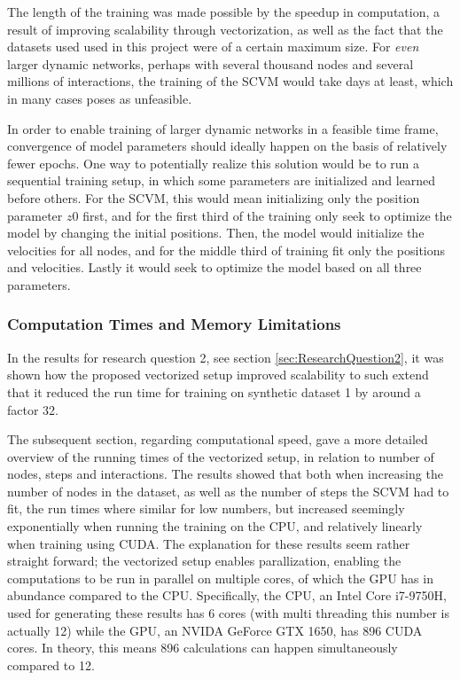 The length of the training was made possible by the speedup in computation, a result of improving scalability through vectorization, as well as the fact that the datasets used used in this project were of a certain maximum size.
For \textit{even} larger dynamic networks, perhaps with several thousand nodes and several millions of interactions, the training of the SCVM would take days at least, which in many cases poses as unfeasible. 

In order to enable training of larger dynamic networks in a feasible time frame, convergence of model parameters should ideally happen on the basis of relatively fewer epochs.
One way to potentially realize this solution would be to run a sequential training setup, in which some parameters are initialized and learned before others.
For the SCVM, this would mean initializing only the position parameter $z0$ first, and for the first third of the training only seek to optimize the model by changing the initial positions.
Then, the model would initialize the velocities for all nodes, and for the middle third of training fit only the positions and velocities. 
Lastly it would seek to optimize the model based on all three parameters.




\subsubsection{Computation Times and Memory Limitations}
\label{sec:Discussion:Results:MemoryLimitations}
In the results for research question 2, see section \ref{sec:ResearchQuestion2}, it was shown how the proposed vectorized setup improved scalability to such extend that it reduced the run time for training on synthetic dataset 1 by around a factor 32.

The subsequent section, regarding computational speed, gave a more detailed overview of the running times of the vectorized setup, in relation to number of nodes, steps and interactions.
The results showed that both when increasing the number of nodes in the dataset, as well as the number of steps the SCVM had to fit, the run times where similar for low numbers, but increased seemingly exponentially when running the training on the CPU, and relatively linearly when training using CUDA.
The explanation for these results seem rather straight forward; the vectorized setup enables parallization, enabling the computations to be run in parallel on multiple cores, of which the GPU has in abundance compared to the CPU. 
Specifically, the CPU, an Intel Core i7-9750H, used for generating these results has 6 cores (with multi threading this number is actually 12) while the GPU, an NVIDA GeForce GTX 1650, has 896 CUDA cores.
In theory, this means 896 calculations can happen simultaneously compared to 12.

